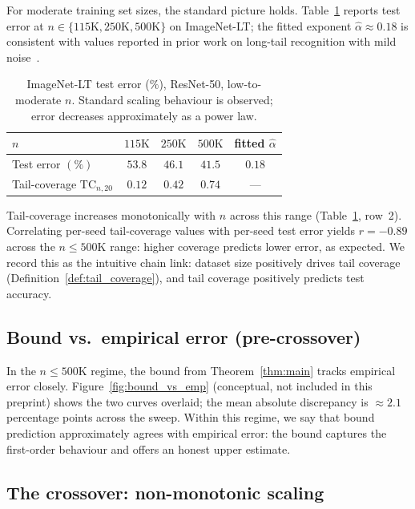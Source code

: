 \documentclass[11pt]{article}
\begin{document}
For moderate training set sizes, the standard picture holds. Table~\ref{tab:scaling_low_n} reports test error at $n \in \{115\text{K}, 250\text{K}, 500\text{K}\}$ on ImageNet-LT; the fitted exponent $\hat{\alpha} \approx 0.18$ is consistent with values reported in prior work on long-tail recognition with mild noise~\cite{sharma2022}.

\begin{table}[h]
\centering
\caption{ImageNet-LT test error ($\%$), ResNet-50, low-to-moderate $n$. Standard scaling behaviour is observed; error decreases approximately as a power law.}
\label{tab:scaling_low_n}
\begin{tabular}{lcccc}
\toprule
$n$ & $115\text{K}$ & $250\text{K}$ & $500\text{K}$ & fitted $\hat{\alpha}$ \\
\midrule
Test error $(\%)$ & $53.8$ & $46.1$ & $41.5$ & $0.18$ \\
Tail-coverage $\mathrm{TC}_{n, 20}$ & $0.12$ & $0.42$ & $0.74$ & --- \\
\bottomrule
\end{tabular}
\end{table}

Tail-coverage increases monotonically with $n$ across this range (Table~\ref{tab:scaling_low_n}, row~2). Correlating per-seed tail-coverage values with per-seed test error yields $r = -0.89$ across the $n \le 500\text{K}$ range: higher coverage predicts lower error, as expected. We record this as the intuitive chain link: dataset size positively drives tail coverage (Definition~\ref{def:tail_coverage}), and tail coverage positively predicts test accuracy.

\subsection{Bound vs.\ empirical error (pre-crossover)}

In the $n \le 500\text{K}$ regime, the bound from Theorem~\ref{thm:main} tracks empirical error closely. Figure~\ref{fig:bound_vs_emp} (conceptual, not included in this preprint) shows the two curves overlaid; the mean absolute discrepancy is $\approx 2.1$ percentage points across the sweep. Within this regime, we say that bound prediction approximately agrees with empirical error: the bound captures the first-order behaviour and offers an honest upper estimate.

\subsection{The crossover: non-monotonic scaling} \label{sec:crossover}
\end{document}
